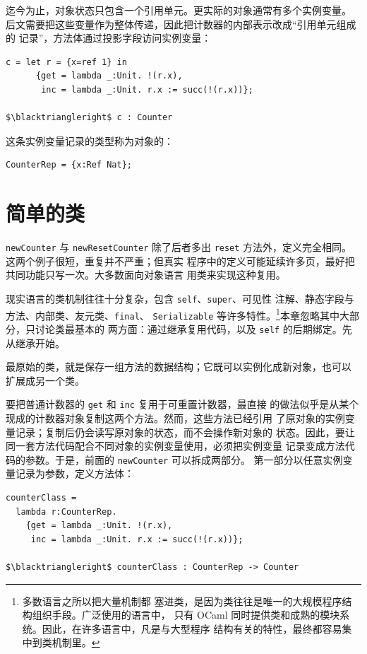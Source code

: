 迄今为止，对象状态只包含一个引用单元。更实际的对象通常有多个实例变量。
后文需要把这些变量作为整体传递，因此把计数器的内部表示改成“引用单元组成的
记录”，方法体通过投影字段访问实例变量：

\begin{lstlisting}[mathescape=true]
c = let r = {x=ref 1} in
      {get = lambda _:Unit. !(r.x),
       inc = lambda _:Unit. r.x := succ(!(r.x))};

$\blacktriangleright$ c : Counter
\end{lstlisting}

这条实例变量记录的类型称为对象的：

\begin{lstlisting}[mathescape=true]
CounterRep = {x:Ref Nat};
\end{lstlisting}

\section{简单的类}
\label{sec:18.6}

\texttt{newCounter} 与 \texttt{newResetCounter} 除了后者多出
\texttt{reset} 方法外，定义完全相同。这两个例子很短，重复并不严重；但真实
程序中的定义可能延续许多页，最好把共同功能只写一次。大多数面向对象语言
用类来实现这种复用。

现实语言的类机制往往十分复杂，包含 \texttt{self}、\texttt{super}、可见性
注解、静态字段与方法、内部类、友元类、\texttt{final}、
\texttt{Serializable} 等许多特性。\footnote{多数语言之所以把大量机制都
塞进类，是因为类往往是唯一的大规模程序结构组织手段。广泛使用的语言中，
只有 OCaml 同时提供类和成熟的模块系统。因此，在许多语言中，凡是与大型程序
结构有关的特性，最终都容易集中到类机制里。}本章忽略其中大部分，只讨论类最基本的
两方面：通过继承复用代码，以及 \texttt{self} 的后期绑定。先从继承开始。

最原始的类，就是保存一组方法的数据结构；它既可以实例化成新对象，也可以
扩展成另一个类。

要把普通计数器的 \texttt{get} 和 \texttt{inc} 复用于可重置计数器，最直接
的做法似乎是从某个现成的计数器对象复制这两个方法。然而，这些方法已经引用
了原对象的实例变量记录；复制后仍会读写原对象的状态，而不会操作新对象的
状态。因此，要让同一套方法代码配合不同对象的实例变量使用，必须把实例变量
记录变成方法代码的参数。于是，前面的 \texttt{newCounter} 可以拆成两部分。
第一部分以任意实例变量记录为参数，定义方法体：

\begin{lstlisting}[mathescape=true]
counterClass =
  lambda r:CounterRep.
    {get = lambda _:Unit. !(r.x),
     inc = lambda _:Unit. r.x := succ(!(r.x))};

$\blacktriangleright$ counterClass : CounterRep -> Counter
\end{lstlisting}

